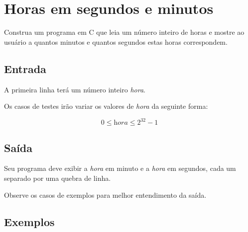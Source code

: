 \section{Horas em segundos e minutos}

Construa um programa em C que leia um número inteiro de horas e mostre ao 
usuário a quantos minutos e quantos segundos estas horas correspondem.

\subsection*{Entrada}

A primeira linha terá um número inteiro \textit{hora}.

Os casos de testes irão variar os valores de \textit{hora} da seguinte forma:

$$0 \leq \textit{hora} \leq 2^{32}-1$$

\subsection*{Saída}

Seu programa deve exibir a \textit{hora} em minuto e a \textit{hora} em segundos,
cada um separado por uma quebra de linha.

Observe os casos de exemplos para melhor entendimento da saída.

\subsection*{Exemplos}





